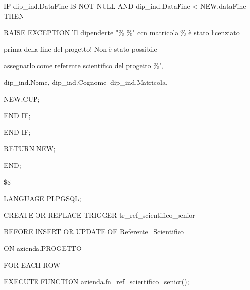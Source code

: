 \begin{flushleft}
\begin{description}
\begin{description}
                    \begin{description}
                        \item IF dip\_ind.DataFine IS NOT NULL AND dip\_ind.DataFine < NEW.dataFine THEN
                        \vspace{0.2cm}
                        \begin{description}
                            \item RAISE EXCEPTION 'Il dipendente "\% \%" con matricola \% è stato licenziato
                            \item \hspace{3cm}prima della fine del progetto! Non è stato possibile
                            \item \hspace{3cm}assegnarlo come referente scientifico del progetto \%',
                            \item \hspace{3cm}dip\_ind.Nome, dip\_ind.Cognome, dip\_ind.Matricola,
                            \item \hspace{3cm}NEW.CUP;
                        \end{description}
                        \item END IF;
                    \end{description}
                    \item END IF;
                    \item 
                    \item RETURN NEW;
                \end{description}
                \item END;
                \item \$\$
                \item LANGUAGE PLPGSQL;
            \end{description}
        \end{flushleft}
    \normalfont

    \ttfamily
        \begin{flushleft}
            \begin{description}
                \item CREATE OR REPLACE TRIGGER tr\_ref\_scientifico\_senior
                \item BEFORE INSERT OR UPDATE OF Referente\_Scientifico
                \item ON azienda.PROGETTO
                \item FOR EACH ROW
                \item EXECUTE FUNCTION azienda.fn\_ref\_scientifico\_senior();
            \end{description}
        \end{flushleft}
    \normalfont

